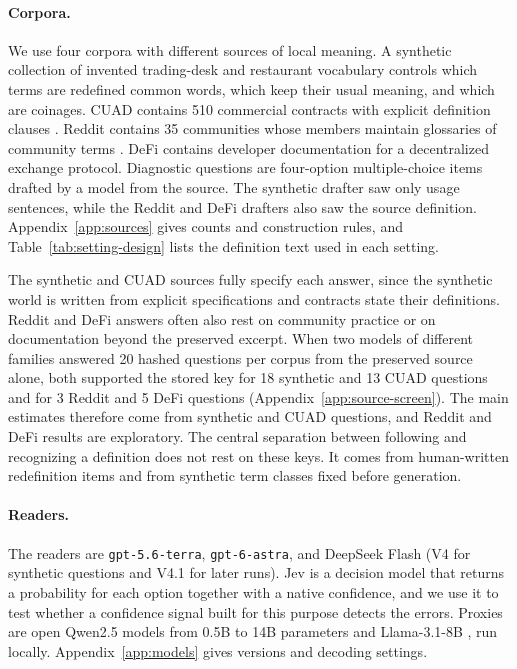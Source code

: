 \paragraph{Corpora.}
We use four corpora with different sources of local meaning. A synthetic collection of invented trading-desk and restaurant vocabulary controls which terms are redefined common words, which keep their usual meaning, and which are coinages. CUAD contains 510 commercial contracts with explicit definition clauses \citep{cuad}. Reddit contains 35 communities whose members maintain glossaries of community terms \citep{lucy-bamman-glossaries}. DeFi contains developer documentation for a decentralized exchange protocol. Diagnostic questions are four-option multiple-choice items drafted by a model from the source. The synthetic drafter saw only usage sentences, while the Reddit and DeFi drafters also saw the source definition. Appendix~\ref{app:sources} gives counts and construction rules, and Table~\ref{tab:setting-design} lists the definition text used in each setting.

The synthetic and CUAD sources fully specify each answer, since the synthetic world is written from explicit specifications and contracts state their definitions. Reddit and DeFi answers often also rest on community practice or on documentation beyond the preserved excerpt. When two models of different families answered 20 hashed questions per corpus from the preserved source alone, both supported the stored key for 18 synthetic and 13 CUAD questions and for 3 Reddit and 5 DeFi questions (Appendix~\ref{app:source-screen}). The main estimates therefore come from synthetic and CUAD questions, and Reddit and DeFi results are exploratory. The central separation between following and recognizing a definition does not rest on these keys. It comes from human-written redefinition items and from synthetic term classes fixed before generation.

\paragraph{Readers.}
The readers are \texttt{gpt-5.6-terra}, \texttt{gpt-6-astra}, and DeepSeek Flash (V4 for synthetic questions and V4.1 for later runs). Jev \citep{jev} is a decision model that returns a probability for each option together with a native confidence, and we use it to test whether a confidence signal built for this purpose detects the errors. Proxies are open Qwen2.5 models from 0.5B to 14B parameters and Llama-3.1-8B \citep{qwen,llama}, run locally. Appendix~\ref{app:models} gives versions and decoding settings.
